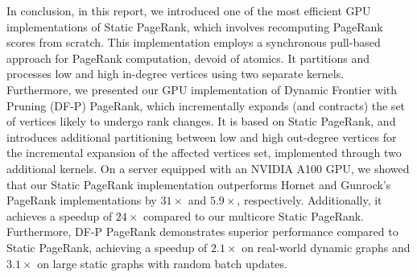 In conclusion, in this report, we introduced one of the most efficient GPU implementations of Static PageRank, which involves recomputing PageRank scores from scratch. This implementation employs a synchronous pull-based approach for PageRank computation, devoid of atomics. It partitions and processes low and high in-degree vertices using two separate kernels. Furthermore, we presented our GPU implementation of Dynamic Frontier with Pruning (DF-P) PageRank, which incrementally expands (and contracts) the set of vertices likely to undergo rank changes. It is based on Static PageRank, and introduces additional partitioning between low and high out-degree vertices for the incremental expansion of the affected vertices set, implemented through two additional kernels. On a server equipped with an NVIDIA A100 GPU, we showed that our Static PageRank implementation outperforms Hornet and Gunrock's PageRank implementations by $31\times$ and $5.9\times$, respectively. Additionally, it achieves a speedup of $24\times$ compared to our multicore Static PageRank. Furthermore, DF-P PageRank demonstrates superior performance compared to Static PageRank, achieving a speedup of $2.1\times$ on real-world dynamic graphs and $3.1\times$ on large static graphs with random batch updates.
